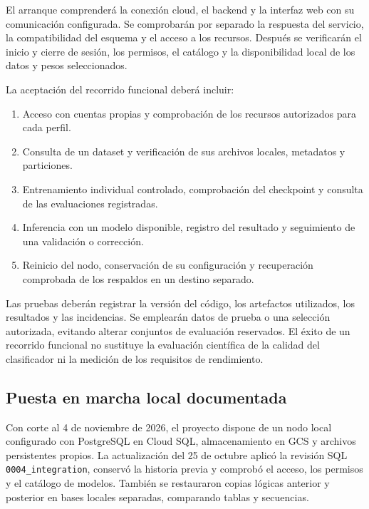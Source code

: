 El arranque comprenderá la conexión cloud, el backend y la interfaz web con
su comunicación configurada. Se comprobarán por separado la respuesta del
servicio, la compatibilidad del esquema y el acceso a los recursos. Después se
verificarán el inicio y cierre de sesión, los permisos, el catálogo y la
disponibilidad local de los datos y pesos seleccionados.

La aceptación del recorrido funcional deberá incluir:

\begin{enumerate}
    \item Acceso con cuentas propias y comprobación de los recursos
    autorizados para cada perfil.
    \item Consulta de un dataset y verificación de sus archivos locales,
    metadatos y particiones.
    \item Entrenamiento individual controlado, comprobación del checkpoint y
    consulta de las evaluaciones registradas.
    \item Inferencia con un modelo disponible, registro del resultado y
    seguimiento de una validación o corrección.
    \item Reinicio del nodo, conservación de su configuración y recuperación
    comprobada de los respaldos en un destino separado.
\end{enumerate}

Las pruebas deberán registrar la versión del código, los artefactos utilizados,
los resultados y las incidencias. Se emplearán datos de prueba o una selección
autorizada, evitando alterar conjuntos de evaluación reservados. El éxito de
un recorrido funcional no sustituye la evaluación científica de la calidad
del clasificador ni la medición de los requisitos de rendimiento.

\subsection{Puesta en marcha local documentada}

Con corte al 4 de noviembre de 2026, el proyecto dispone de un nodo local
configurado con PostgreSQL en Cloud SQL, almacenamiento en GCS y archivos
persistentes propios. La actualización del 25 de octubre aplicó la revisión
SQL \texttt{0004\_integration}, conservó la historia previa y comprobó el
acceso, los permisos y el catálogo de modelos. También se restauraron copias
lógicas anterior y posterior en bases locales separadas, comparando tablas
y secuencias.

